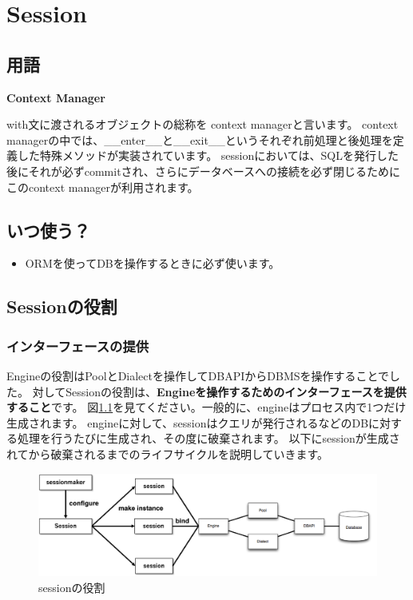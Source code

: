 \chapter{Session}

\section{用語}

\begin{dfn}
  \textbf{Context Manager}
\end{dfn}

with文に渡されるオブジェクトの総称を context managerと言います。
context managerの中では、\_\_enter\_\_と\_\_exit\_\_というそれぞれ前処理と後処理を定義した特殊メソッドが実装されています。
sessionにおいては、SQLを発行した後にそれが必ずcommitされ、さらにデータベースへの接続を必ず閉じるためにこのcontext managerが利用されます。


\section{いつ使う？}
\begin{itemize}
  \item {ORMを使ってDBを操作するときに必ず使います。}
\end{itemize}



\section {Sessionの役割}

\subsection{インターフェースの提供}
\label{session.interface}
Engineの役割はPoolとDialectを操作してDBAPIからDBMSを操作することでした。
対してSessionの役割は、\textbf{Engineを操作するためのインターフェースを提供すること}です。
図\ref{session}を見てください。一般的に、engineはプロセス内で1つだけ生成されます。
engineに対して、sessionはクエリが発行されるなどのDBに対する処理を行うたびに生成され、その度に破棄されます。
以下にsessionが生成されてから破棄されるまでのライフサイクルを説明していきます。
\\

\begin{figure}[H]
\begin{center}
\includegraphics[width=14cm]{session/session.png}
\caption{sessionの役割}
\label{session}
\end{center}
\end{figure}

